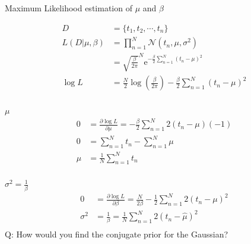\begin{bbbox}{Maximum Likelihood estimation of $\mu$ and $\beta$}

	  \begin{align*}
	  	D &= \{ t_1 , t_2 ,\cdots , t_n \} \\
	  	L(D|\mu,\beta) &= \prod_{n=1}^N \mathcal{N} \left( t_n,\mu,\sigma^2 \right) \\
	  				   &= \sqrt{\frac{\beta}{2\pi}}^N \mbox{e}^{-\frac{\beta}{2} \sum_{n=1}^N \left(t_n - \mu\right)^2} \\
		\log L &= \frac{N}{2} \log \left( \frac{\beta}{2\pi} \right) - \frac{\beta}{2} \sum_{n=1}^N \left(t_n - \mu\right)^2 \\
		\end{align*}
		
		 $\mu$ \\
		\begin{align*}
		0 &= \frac{\partial \log L}{\partial \mu} = -\frac{\beta}{2} \sum_{n=1}^N 2 \left(t_n - \mu \right) (-1) \\
		0 &= \sum_{n=1}^N t_n - \sum_{n=1}^N \mu \\
		\mu &= \frac{1}{N} \sum_{n=1}^N t_n \\
		\end{align*}
		
		 $\sigma^2 = \frac{1}{\beta}$ \\
		\begin{align*}
		0 &= \frac{\partial \log L}{\partial \beta} = \frac{N}{2\beta} - \frac{1}{2} \sum_{n=1}^N 2 \left(t_n - \mu \right)^2 \\
		\sigma^2 &= \frac{1}{\beta} = \frac{1}{N} \sum_{n=1}^N 2 \left(t_n - \hat{\mu} \right)^2 \\
	  \end{align*}
Q: How would you find the conjugate prior for the Gaussian? \\

\end{bbbox}

